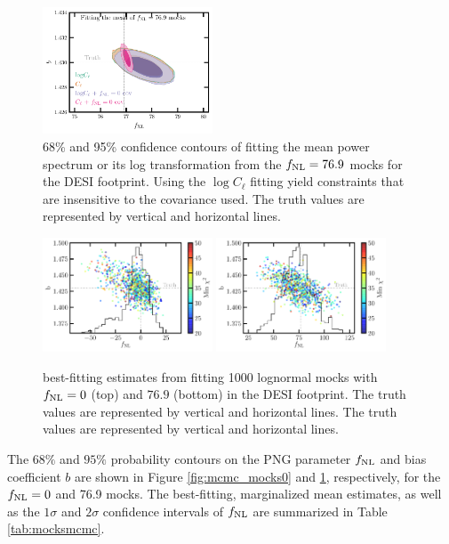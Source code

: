 \begin{figure}
    \centering
    \includegraphics[width=0.45\textwidth]{figures/mcmc_po100.pdf} 
    \caption{68\% and 95\% confidence contours of fitting the mean power spectrum or its log transformation from the $f_{\rm NL}=76.9$ mocks for the DESI footprint. Using the $\log C_{\ell}$ fitting yield constraints that are insensitive to the covariance used. The truth values are represented by vertical and horizontal lines.}\label{fig:mcmc_mocks100}
\end{figure}

\begin{figure}
    \centering    \includegraphics[width=0.45\textwidth]{figures/bestfit_zero.pdf} 
    \includegraphics[width=0.45\textwidth]{figures/bestfit_po100.pdf}         
    \caption{best-fitting estimates from fitting 1000 lognormal mocks with $f_{\rm NL}=0$ (top) and $76.9$ (bottom) in the DESI footprint. The truth values are represented by vertical and horizontal lines. The truth values are represented by vertical and horizontal lines.}\label{fig:bestfit_mocks}
\end{figure}

The $68\%$ and $95\%$ probability contours on the PNG parameter $f_{\rm NL}$ and bias coefficient $b$ are shown in Figure \ref{fig:mcmc_mocks0} and \ref{fig:mcmc_mocks100}, respectively, for the $f_{\rm NL}=0$ and 76.9 mocks. The best-fitting, marginalized mean estimates, as well as the $1\sigma$ and $2\sigma$ confidence intervals of $f_{\rm NL}$ are summarized in Table \ref{tab:mocksmcmc}. 

